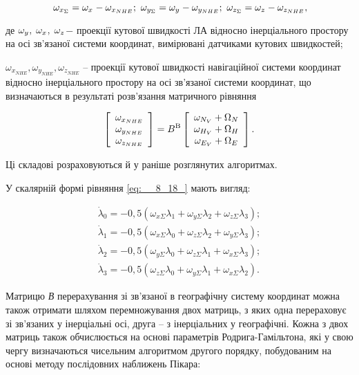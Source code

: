 \[\, \omega_{x_{\Sigma } } =\omega_{x_{{\rm }} } -\omega_{x_{NHE} } ;\, \, \omega 
_{y_{\Sigma } } =\omega_{y_{{\rm }} } -\omega_{y_{NHE} } ;\, \, \omega_{z_{\Sigma 
} } =\omega_{z_{{\rm }} } -\omega_{z_{NHE} } ,\] 

де  $\omega_{y_{{\rm }} } ,{\rm \; }\omega_{x_{{\rm }} } ,{\rm \; }\omega_{z_{{
\rm }} } $$-$ проекції кутової швидкості ЛА відносно інерціального простору на осі 
зв'язаної системи координат, вимірювані датчиками кутових швидкостей;

$\omega_{x_{NHE} } ,\omega_{y_{NHE} } ,\omega_{z_{NHE} } $ -- проекції кутової 
швидкості навігаційної системи координат відносно інерціального простору на осі зв'язаної 
системи координат, що визначаються в результаті розв'язання матричного рівняння 

\[\left[
\begin{array}{c} {\omega_{x_{NHE} } } \\ {\omega_{y_{NHE} } } \\ {\omega_{z_{NHE} 
} } \end{array}\right]=B^{{\rm B}} \left[\begin{array}{c} {\omega_{N_{V} } +\Omega 
_{N} } \\ {\omega_{H_{V} } +\Omega_{H} } \\ {\omega_{E_{V} } +\Omega_{E} } \end{array}
\right].\] 

Ці складові розраховуються й у раніше розглянутих алгоритмах.


У скалярній формі рівняння \eqref{eq:__8_18_} мають вигляд:

\[\begin{array}{l} {\dot{\lambda }_{0} =-0,5(\omega_{x\Sigma } \lambda_{1} +\omega 
_{y\Sigma } \lambda_{2} +\omega_{z\Sigma } \lambda_{3} );} \\ {\dot{\lambda }_{1} 
=-0,5(\omega_{x\Sigma } \lambda_{0} +\omega_{z\Sigma } \lambda_{2} +\omega_{y
\Sigma } \lambda_{3} );} \\ {\dot{\lambda }_{2} =-0,5(\omega_{y\Sigma } \lambda 
_{0} +\omega_{z\Sigma } \lambda_{1} +\omega_{x\Sigma } \lambda_{3} );} \\ {\dot{
\lambda }_{3} =-0,5(\omega_{z\Sigma } \lambda_{0} +\omega_{y\Sigma } \lambda_{1} 
+\omega_{x\Sigma } \lambda_{2} ).} \end{array}\] 

Матрицю \textit{В} перерахування зі зв'язаної в географічну систему координат можна 
також отримати шляхом перемножування двох матриць, з яких одна перераховує зі зв'язаних 
у інерціальні осі, друга -- з інерціальних у географічні. Кожна з двох матриць також 
обчислюється на основі параметрів Родрига-Гамільтона, які у свою чергу визначаються 
чисельним алгоритмом другого порядку, побудованим на основі методу послідовних наближень  
Пікара:

